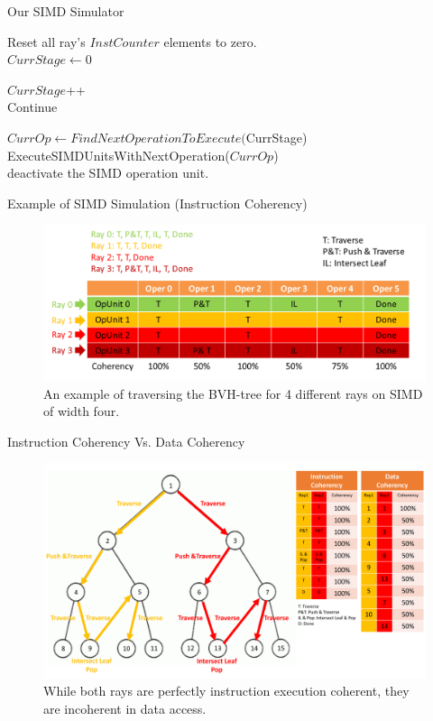 \documentclass{beamer}
\begin{document}
\begin{frame}{Our SIMD Simulator}
	\begin{algorithm}[H]
			Reset all ray's $InstCounter$ elements to zero.\\
			$CurrStage \leftarrow 0$\\
			{
				{
					$CurrStage$++\\
					Continue\\
				}
				
				$CurrOp \leftarrow FindNextOperationToExecute($CurrStage)\\
				ExecuteSIMDUnitsWithNextOperation($CurrOp$)\\
				{
					deactivate the SIMD operation unit.
				}
			}
	\end{algorithm}
\end{frame}

\begin{frame}{Example of SIMD Simulation (Instruction Coherency)}
	\begin{figure}
		\includegraphics[width=\linewidth]{figures/SIMDExecEg}
		\caption{An example of traversing the BVH-tree for 4 different rays on SIMD of width four.}
	\end{figure}
\end{frame}

\begin{frame}{Instruction Coherency Vs. Data Coherency}
	\begin{figure}
		\includegraphics[width=\linewidth]{figures/InstCohEg}
		\caption{While both rays are perfectly instruction execution coherent, they are incoherent in data access.}
	\end{figure}
\end{frame}
\end{document}

